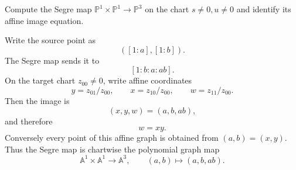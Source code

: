 \begin{problem}\label{prob:vi36-09}
Compute the Segre map \(\mathbb P^1\times\mathbb P^1\to\mathbb P^3\) on the chart \(s\ne0,u\ne0\) and identify its affine image equation.
\end{problem}

\ifdefined\FullProblemDossiers
\begin{solution}
Write the source point as
\[
([1:a],[1:b]).
\]
The Segre map sends it to
\[
[1:b:a:ab].
\]
On the target chart \(z_{00}\neq0\), write affine coordinates
\[
y=z_{01}/z_{00},
\qquad
x=z_{10}/z_{00},
\qquad
w=z_{11}/z_{00}.
\]
Then the image is
\[
(x,y,w)=(a,b,ab),
\]
and therefore
\[
\boxed{w=xy}.
\]
Conversely every point of this affine graph is obtained from \((a,b)=(x,y)\). Thus the Segre map is chartwise the
polynomial graph map
\[
\mathbb A^1\times\mathbb A^1\to\mathbb A^3,
\qquad
(a,b)\mapsto(a,b,ab).
\]
\end{solution}
\fi
